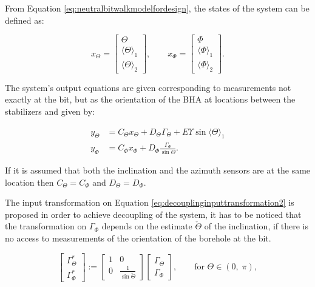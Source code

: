 \documentclass[main.tex]{subfiles}
\begin{document}
	From Equation \eqref{eq:neutralbitwalkmodelfordesign}, the states of the system can be defined as:
	
	\begin{equation}
	x_\Theta = \begin{bmatrix}
	\Theta \\
	\langle \Theta \rangle_1\\
	\langle\Theta \rangle_2 
	\end{bmatrix}, \qquad
	x_\Phi = \begin{bmatrix}
	\Phi \\
	\langle \Phi \rangle_1\\
	\langle\Phi \rangle_2 
	\end{bmatrix}.
	\end{equation}
	
	The system's output equations are given corresponding to measurements not exactly at the bit, but as the orientation of the BHA at locations between the stabilizers and given by:
	
	\begin{align}
		y_\Theta &= C_\Theta x_\Theta + D_\Theta \Gamma_\Theta + E \Upsilon \sin \langle \Theta \rangle_1\\
		y_\Phi &= C_\Phi x_\Phi + D_\Phi \frac{\Gamma_\Phi}{\sin \Theta}.		
	\end{align}
	
	If it is assumed that both the inclination and the azimuth sensors are at the same location then $C_\Theta = C_\Phi$ and $D_\Theta = D_\Phi$.

	The input transformation on Equation \eqref{eq:decouplinginputtransformation2} is proposed in order to achieve decoupling of the system, it has to be noticed that the transformation on $\Gamma_\Phi$ depends on the estimate $\check{\Theta}$ of the inclination, if there is no access to measurements of the orientation of the borehole at the bit.
	
	\begin{equation}
	\begin{bmatrix}
	\Gamma_{\!\Theta}^* \\ \Gamma_{\!\Phi}^* 	
	\end{bmatrix} :=  \begin{bmatrix} 1 & 0 \\ 0 & \frac{1}{\sin \check{\Theta}}\end{bmatrix} \begin{bmatrix}\Gamma_{\!\Theta} \\ \Gamma_{\!\Phi} \end{bmatrix}, \qquad \text{for } \Theta\in (0,\; \pi),
	\label{eq:decouplinginputtransformation2}
	\end{equation}
	
\end{document}
